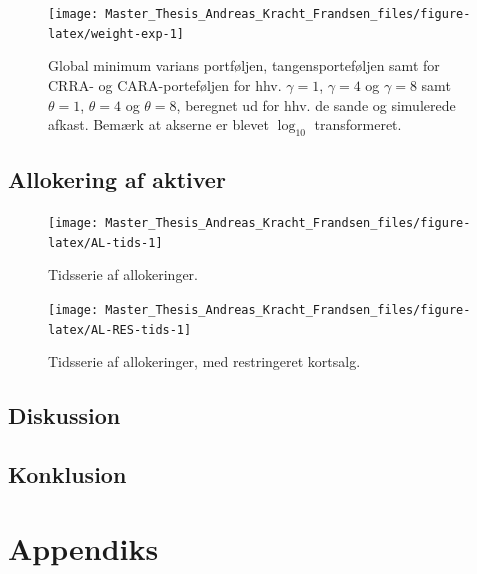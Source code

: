 \documentclass[
  a4paper,
  oneside]{memoir}
\begin{document}
\begin{figure}[htbp!]

{\centering \texttt{[image: Master\_Thesis\_Andreas\_Kracht\_Frandsen\_files/figure-latex/weight-exp-1]} 

}

\caption{Global minimum varians portføljen, tangensporteføljen samt for CRRA- og CARA-porteføljen for hhv. $\gamma=1$, $\gamma=4$ og $\gamma=8$ samt $\theta=1$, $\theta=4$ og $\theta=8$, beregnet ud for hhv. de sande og simulerede afkast. Bemærk at akserne er blevet $\log_{10}$ transformeret.}\label{fig:weight-exp}
\end{figure}

\hypertarget{allokering-af-aktiver}{%
\chapter{Allokering af aktiver}\label{allokering-af-aktiver}}

\begin{figure}[htbp!]

{\centering \texttt{[image: Master\_Thesis\_Andreas\_Kracht\_Frandsen\_files/figure-latex/AL-tids-1]} 

}

\caption{Tidsserie af allokeringer.}\label{fig:AL-tids}
\end{figure}

\begin{figure}[htbp!]

{\centering \texttt{[image: Master\_Thesis\_Andreas\_Kracht\_Frandsen\_files/figure-latex/AL-RES-tids-1]} 

}

\caption{Tidsserie af allokeringer, med restringeret kortsalg.}\label{fig:AL-RES-tids}
\end{figure}

\hypertarget{diskussion}{%
\chapter{Diskussion}\label{diskussion}}

\hypertarget{konklusion}{%
\chapter{Konklusion}\label{konklusion}}

\hypertarget{appendix-appendiks}{%
\appendix}


\part{Appendiks}
\end{document}
